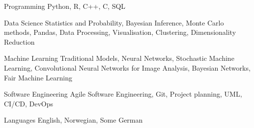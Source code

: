 

\begin{cvskills}

  \cvskill
    {Programming} %
    {Python, R, C++, C, SQL} %

  \cvskill
    {Data Science} %
    {Statistics and Probability, Bayesian Inference, Monte Carlo methods, Pandas, Data Processing, Visualisation, Clustering, Dimensionality Reduction} %

  \cvskill
    {Machine Learning} %
    {Traditional Models, Neural Networks, Stochastic Machine Learning, \newline Convolutional Neural Networks for Image Analysis, Bayesian Networks, Fair Machine Learning} %

  \cvskill
    {Software Engineering} %
    {Agile Software Engineering, Git, Project planning, UML, CI/CD, DevOps} %

  \cvskill
    {Languages} %
    {English, Norwegian, Some German} %

\end{cvskills}

